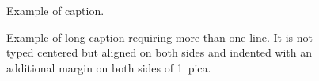 \documentclass[times, 10pt,twocolumn]{article}
\begin{document}
	
	
	
	
	
	
	\begin{figure}[h]
		\caption{Example of caption.}
	\end{figure}
	
	
	\begin{figure}[h] 
		\caption{Example of long caption requiring more than one line. It is 
			not typed centered but aligned on both sides and indented with an 
			additional margin on both sides of 1~pica.}
	\end{figure}
	
	
	
	\nocite{ex1,ex2}
	
	
	
\end{document}

